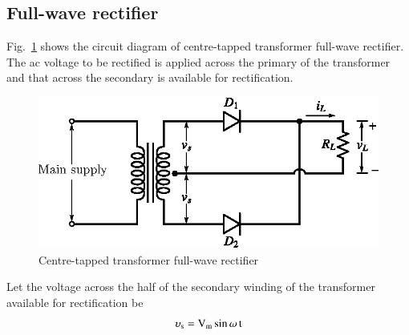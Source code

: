 \subsection{Full-wave rectifier}\label{sec1.10.2}

Fig.~\ref{fig1.32} shows the circuit diagram of centre-tapped transformer full-wave rectifier. The ac voltage to be rectified is applied across the primary of the transformer and that across the secondary is available for rectification.
\begin{figure}[H]
\centering
\includegraphics{chap1/fig1.32.eps}
\caption{Centre-tapped transformer full-wave rectifier}\label{fig1.32}
\end{figure}

Let the voltage across the half of the secondary winding of the transformer available for rectification be
$$
\upsilon_{\textrm{s}}=\textrm{V}_{\textrm{m}}\sin \omega\, \textrm{t}
$$

\eject

